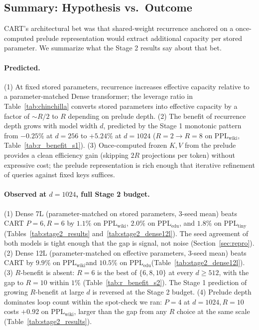 \documentclass{article}
\newcommand{\cart}{\textsc{CART}}
\newcommand{\pplwiki}{PPL$_\text{wiki}$}
\newcommand{\ppltiny}{PPL$_\text{tiny}$}
\newcommand{\ppledu}{PPL$_\text{edu}$}
\begin{document}
\subsection{Summary: Hypothesis vs.\ Outcome}
\label{sec:hyp_vs_outcome}

\cart{}'s architectural bet was that shared-weight recurrence anchored on a once-computed prelude representation would extract additional capacity per stored parameter. We summarize what the Stage 2 results say about that bet.

\paragraph{Predicted.}
(1) At fixed stored parameters, recurrence increases effective capacity relative to a parameter-matched Dense transformer; the leverage ratio in Table~\ref{tab:chinchilla} converts stored parameters into effective capacity by a factor of $\sim R/2$ to $R$ depending on prelude depth. (2) The benefit of recurrence depth grows with model width $d$, predicted by the Stage 1 monotonic pattern from $-0.25\%$ at $d{=}256$ to $+5.24\%$ at $d{=}1024$ ($R{=}2 \to R{=}8$ on \pplwiki, Table~\ref{tab:r_benefit_s1}). (3) Once-computed frozen $K, V$ from the prelude provides a clean efficiency gain (skipping $2R$ projections per token) without expressive cost; the prelude representation is rich enough that iterative refinement of queries against fixed keys suffices.

\paragraph{Observed at $d{=}1024$, full Stage 2 budget.}
(1) Dense 7L (parameter-matched on stored parameters, 3-seed mean) beats \cart{} $P{=}6, R{=}6$ by $1.1\%$ on \pplwiki, $2.0\%$ on \ppledu, and $1.8\%$ on \ppltiny{} (Tables~\ref{tab:stage2_results} and~\ref{tab:stage2_dense12l}). The seed agreement of both models is tight enough that the gap is signal, not noise (Section~\ref{sec:repro}). (2) Dense 12L (parameter-matched on effective parameters, 3-seed mean) beats \cart{} by $9.9\%$ on \pplwiki and $10.5\%$ on \ppledu (Table~\ref{tab:stage2_dense12l}). (3) $R$-benefit is absent: $R{=}6$ is the best of $\{6, 8, 10\}$ at every $d \geq 512$, with the gap to $R{=}10$ within $1\%$ (Table~\ref{tab:r_benefit_s2}). The Stage 1 prediction of growing $R$-benefit at large $d$ is reversed at the Stage 2 budget. (4) Prelude depth dominates loop count within the spot-check we ran: $P{=}4$ at $d{=}1024, R{=}10$ costs $+0.92$ on \pplwiki, larger than the gap from any $R$ choice at the same scale (Table~\ref{tab:stage2_results}).
\end{document}
